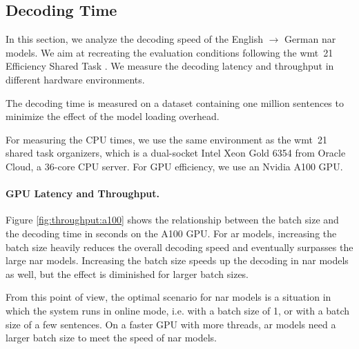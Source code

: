 \subsection{Decoding Time}%
\label{subsec:results:time}

In this section, we analyze the decoding speed of the English $\rightarrow$
German \ac{nar} models. We aim at recreating the evaluation conditions
following the \acs{wmt}~21 Efficiency Shared Task
\citep{heafield-etal-2021-findings}. We measure the decoding latency and
throughput in different hardware environments.

The decoding time is measured on a dataset containing one million sentences to
minimize the effect of the model loading overhead.

For measuring the CPU times, we use the same environment as the \acs{wmt}~21
shared task organizers, which is a dual-socket Intel Xeon Gold 6354 from Oracle
Cloud, a 36-core CPU server. For GPU efficiency, we use an Nvidia A100 GPU.


\paragraph{GPU Latency and Throughput.}
Figure \ref{fig:throughput:a100} shows the relationship between the batch size
and the decoding time in seconds on the A100 GPU.  For \ac{ar} models,
increasing the batch size heavily reduces the overall decoding speed and
eventually surpasses the large \ac{nar} models. Increasing the batch size
speeds up the decoding in \ac{nar} models as well, but the effect is diminished
for larger batch sizes.

From this point of view, the optimal scenario for \ac{nar} models is a
situation in which the system runs in online mode, i.e. with a batch size of 1,
or with a batch size of a few sentences. On a faster GPU with more threads,
\ac{ar} models need a larger batch size to meet the speed of \ac{nar} models.


